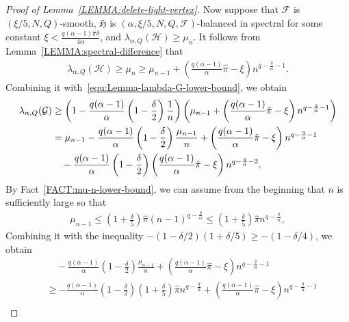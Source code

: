 \documentclass[11pt,a4paper]{article}
\begin{document}
\begin{proof}[Proof of Lemma~\ref{LEMMA:delete-light-vertex}]
    Now suppose that $\mathcal{F}$ is $(\xi/5, N, Q)$-smooth, $\mathfrak{H}$ is $(\alpha, \xi/5, N, Q, \mathcal{F})$-balanced in spectral for some constant $\xi < \frac{q(\alpha-1) \hat{\pi} \delta}{4 \alpha}$, and $\lambda_{\alpha, Q}(\mathcal{H}) \ge \mu_{n}$. 
    It follows from Lemma~\ref{LEMMA:spectral-difference} that 
    \begin{align*}
        \lambda_{\alpha, Q}(\mathcal{H}) 
        \ge \mu_{n}
        \ge \mu_{n-1} + \left( \frac{q(\alpha-1)}{\alpha} \hat{\pi} - \xi \right)n^{q-\frac{q}{\alpha}-1}.
    \end{align*}
    Combining it with~\eqref{equ:Lemma-lambda-G-lower-bound}, we obtain 
    \begin{align}\label{equ:lambda-G-lower-bound}
        \lambda_{\alpha, Q}(\mathcal{G})
        & \ge \left(1 - \frac{q(\alpha-1)}{\alpha} \left( 1-\frac{\delta}{2} \right) \frac{1}{n} \right) \left(\mu_{n-1} + \left( \frac{q(\alpha-1)}{\alpha} \hat{\pi} - \xi \right)n^{q-\frac{q}{\alpha}-1} \right) \notag \\
        & = \mu_{n-1}  - \frac{q(\alpha-1)}{\alpha} \left( 1-\frac{\delta}{2} \right) \frac{\mu_{n-1}}{n}  + \left( \frac{q(\alpha-1)}{\alpha} \hat{\pi} - \xi \right)n^{q-\frac{q}{\alpha}-1}  \notag \\
        & \quad - \frac{q(\alpha-1)}{\alpha} \left( 1-\frac{\delta}{2} \right) \left( \frac{q(\alpha-1)}{\alpha} \hat{\pi} - \xi \right)n^{q-\frac{q}{\alpha}-2}. 
    \end{align}
    By Fact~\ref{FACT:mu-n-lower-bound}, we can assume from the beginning that $n$ is sufficiently large so that
    \begin{align*}
        \mu_{n-1} 
        \le \left(1+\frac{\delta}{5}\right) \hat{\pi} (n-1)^{q-\frac{q}{\alpha}} 
        \le \left(1+\frac{\delta}{5}\right) \hat{\pi} n^{q-\frac{q}{\alpha}},
    \end{align*}
    Combining it with the inequality $-(1-\delta/2)(1+\delta/5) \ge -(1-\delta/4)$, we obtain 
    \begin{align*}
        & \quad - \frac{q(\alpha-1)}{\alpha} \left( 1-\frac{\delta}{2} \right) \frac{\mu_{n-1}}{n}  + \left( \frac{q(\alpha-1)}{\alpha} \hat{\pi} - \xi \right)n^{q-\frac{q}{\alpha}-1} \\
        & \ge - \frac{q(\alpha-1)}{\alpha} \left( 1-\frac{\delta}{2} \right) \left(1+\frac{\delta}{5}\right) \hat{\pi} n^{q-\frac{q}{\alpha}}  + \left( \frac{q(\alpha-1)}{\alpha} \hat{\pi} - \xi \right)n^{q-\frac{q}{\alpha}-1}  \\

\end{align*}
\end{proof}
\end{document}
